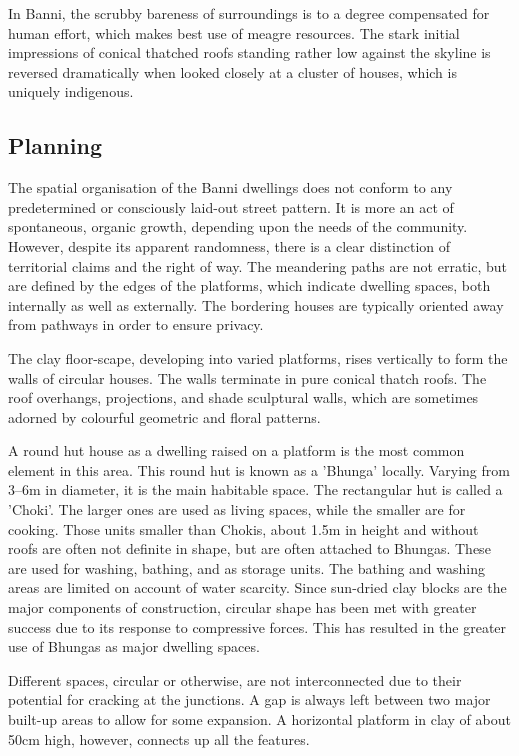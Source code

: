 In Banni, the scrubby bareness of surroundings is to a degree compensated for human effort, which makes best use of meagre resources. The stark initial impressions of conical thatched roofs standing rather low against the skyline is reversed dramatically when looked closely at a cluster of houses, which is uniquely indigenous.


\subsection{Planning} %
\label{sub:bvk_planning}

The spatial organisation of the Banni dwellings does not conform to any predetermined or consciously laid-out street pattern. It is more an act of spontaneous, organic growth, depending upon the needs of the community. However, despite its apparent randomness, there is a clear distinction of territorial claims and the right of way. The meandering paths are not erratic, but are defined by the edges of the platforms, which indicate dwelling spaces, both internally as well as externally. The bordering houses are typically oriented away from pathways in order to ensure privacy.

The clay floor-scape, developing into varied platforms, rises vertically to form the walls of circular houses. The walls terminate in pure conical thatch roofs. The roof overhangs, projections, and shade sculptural walls, which are sometimes adorned by colourful geometric and floral patterns.

A round hut house as a dwelling raised on a platform is the most common element in this area. This round hut is known as a 'Bhunga' locally. Varying from 3--6m in diameter, it is the main habitable space. The rectangular hut is called a 'Choki'. The larger ones are used as living spaces, while the smaller are for cooking. Those units smaller than Chokis, about 1.5m in height and without roofs are often not definite in shape, but are often attached to Bhungas. These are used for washing, bathing, and as storage units. The bathing and washing areas are limited on account of water scarcity. Since sun-dried clay blocks are the major components of construction, circular shape has been met with greater success due to its response to compressive forces. This has resulted in the greater use of Bhungas as major dwelling spaces.

Different spaces, circular or otherwise, are not interconnected due to their potential for cracking at the junctions. A gap is always left between two major built-up areas to allow for some expansion. A horizontal platform in clay of about 50cm high, however, connects up all the features.


